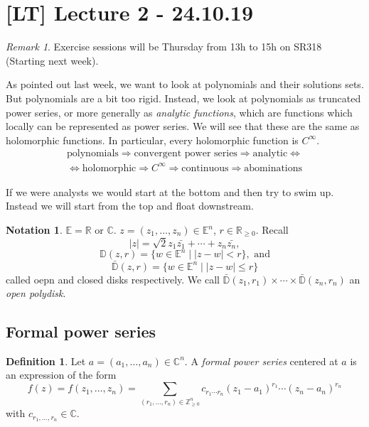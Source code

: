\documentclass[11pt,A4]{article}
\theoremstyle{plain}
\theoremstyle{definition}
\newtheorem{defn}[thm]{Definition}
\newtheorem{nota}[thm]{Notation}
\theoremstyle{remark}
\newtheorem{rem}[thm]{Remark}
\newcommand{\Z}{\mathbb{Z}}
\newcommand{\R}{\mathbb{R}}
\newcommand{\1}{\mathbbm{1}}
\newcommand{\C}{\mathbb{C}}
\newcommand{\bbE}{\mathbb{E}}
\newcommand{\bbD}{\mathbb{D}}
\newcommand{\cbbD}{\bar{\mathbb{D}}}
\begin{document}
\section{[LT] Lecture 2 - 24.10.19}

\begin{rem}
    Exercise sessions will be Thursday from 13h to 15h on SR318 (Starting next week).
\end{rem}

As pointed out last week, we want to look at polynomials and their solutions sets.
But polynomials are a bit too rigid.
Instead, we look at polynomials as truncated power series, or more generally as \textit{analytic functions}, which are functions which locally can be represented as power series.
We will see that these are the same as holomorphic functions.
In particular, every holomorphic function is $C^{\infty}$.
\begin{multline*}
    \text{polynomials} \Rightarrow \text{convergent power series} \Rightarrow \text{analytic} \Leftrightarrow \\
    \Leftrightarrow \text{holomorphic} \Rightarrow C^{\infty}\Rightarrow \text{continuous} \Rightarrow \text{abominations}
\end{multline*}

If we were analysts we would start at the bottom and then try to swim up.
Instead we will start from the top and float downstream.

\begin{nota}
    $\bbE=\R$ or $\C$.
    $z=(z_{1},\ldots,z_{n})\in \bbE^{n}$, $r\in \R_{\geqslant 0}$.
    Recall
    \[ |z|=\sqrt{2}{z_{1}\bar{z_{1}}+\cdots + z_{n}\bar{z_{n}}}, \]
    \[ \bbD(z,r)=\{w\in \bbE^{n}\mid |z-w|<r\}, \text{ and} \]
    \[ \cbbD(z,r)=\{ w\in \bbE^{n}\mid |z-w|\leqslant r\} \]
    called oepn and closed disks respectively.
    We call $\cbbD(z_{1},r_{1})\times \cdots \times \cbbD(z_{n},r_{n})$ an \textit{open polydisk}.
\end{nota}

\subsection{Formal power series}

\begin{defn}
    Let $a=(a_{1},\ldots,a_{n})\in \C^{n}$.
    A \textit{formal power series} centered at $a$ is an expression of the form
    \[ f(z)=f(z_{1},\ldots,z_{n})=\sum_{(r_{1},\ldots, r_{n})\in \Z^{n}_{\geqslant 0}}c_{r_{1}\cdots r_{n}}(z_{1}-a_{1})^{r_{1}}\cdots (z_{n}-a_{n})^{r_{n}} \]
    with $c_{r_{1},\ldots,r_{n}}\in \C$.
\end{defn}
\end{document}
